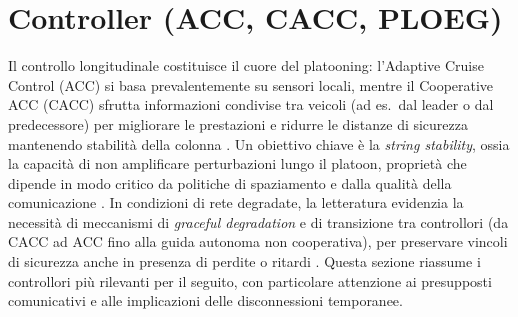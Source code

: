 \section{Controller (ACC, CACC, PLOEG)}
\label{sec:sota_controller}

Il controllo longitudinale costituisce il cuore del platooning: l’Adaptive Cruise Control (ACC) si basa prevalentemente su sensori locali, mentre il Cooperative ACC (CACC) sfrutta informazioni condivise tra veicoli (ad es.\ dal leader o dal predecessore) per migliorare le prestazioni e ridurre le distanze di sicurezza mantenendo stabilità della colonna \cite{ploeg2011design,oncu2014cooperative}. Un obiettivo chiave è la \emph{string stability}, ossia la capacità di non amplificare perturbazioni lungo il platoon, proprietà che dipende in modo critico da politiche di spaziamento e dalla qualità della comunicazione \cite{besselink2017string}. In condizioni di rete degradate, la letteratura evidenzia la necessità di meccanismi di \emph{graceful degradation} e di transizione tra controllori (da CACC ad ACC fino alla guida autonoma non cooperativa), per preservare vincoli di sicurezza anche in presenza di perdite o ritardi \cite{ploeg2015graceful,segata2023multi-technology}. Questa sezione riassume i controllori più rilevanti per il seguito, con particolare attenzione ai presupposti comunicativi e alle implicazioni delle disconnessioni temporanee.
